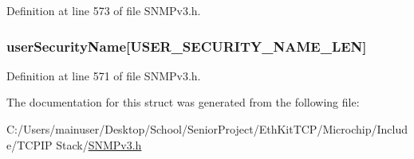 Definition at line 573 of file S\+N\+M\+Pv3.\+h.

\hypertarget{structsnmp_v3_trap_config_data_base_a233710cfa854c724130d58ddf3243310}{}
\subsubsection[{user\+Security\+Name}]{ user\+Security\+Name\mbox{[}{\bf U\+S\+E\+R\+\_\+\+S\+E\+C\+U\+R\+I\+T\+Y\+\_\+\+N\+A\+M\+E\+\_\+\+L\+E\+N}\mbox{]}}\label{structsnmp_v3_trap_config_data_base_a233710cfa854c724130d58ddf3243310}


Definition at line 571 of file S\+N\+M\+Pv3.\+h.



The documentation for this struct was generated from the following file\+:\begin{DoxyCompactItemize}
\item 
C\+:/\+Users/mainuser/\+Desktop/\+School/\+Senior\+Project/\+Eth\+Kit\+T\+C\+P/\+Microchip/\+Include/\+T\+C\+P\+I\+P Stack/\hyperlink{_s_n_m_pv3_8h}{S\+N\+M\+Pv3.\+h}\end{DoxyCompactItemize}
